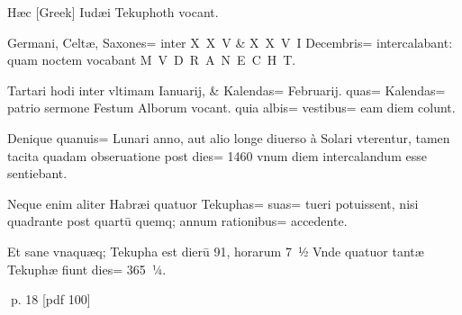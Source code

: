 \begin{parnumbers}
Hæc [Greek] Iudæi Tekuphoth vocant.

Germani, Celtæ, Saxones= inter X X V \& X X V I Decembris= intercalabant: quam noctem vocabant M V D R A N E C H T.

Tartari hodi inter vltimam Ianuarij, \& Kalendas= Februarij. quas= Kalendas= patrio sermone Festum Alborum vocant. quia albis= vestibus= eam diem colunt.

Denique quanuis=  Lunari anno, aut alio longe diuerso à Solari vterentur, tamen tacita quadam obseruatione post dies= 1460 vnum diem intercalandum esse sentiebant.

Neque enim aliter Habræi quatuor Tekuphas= suas= tueri potuissent, nisi quadrante post quartū quemq; annum rationibus= accedente.

Et sane vnaquæq; Tekupha est dierū 91, horarum 7 ½ Vnde quatuor tantæ Tekuphæ fiunt dies= 365 ¼.

\end{parnumbers}
\clearpage
p. 18 [pdf 100]

